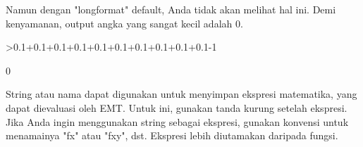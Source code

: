 \documentclass[a4paper,10pt]{article}
\begin{document}
\begin{eulernotebook}
\begin{eulercomment}
Namun dengan "longformat" default, Anda tidak akan melihat hal ini.
Demi kenyamanan, output angka yang sangat kecil adalah 0.
\end{eulercomment}
\begin{eulerprompt}
>0.1+0.1+0.1+0.1+0.1+0.1+0.1+0.1+0.1+0.1-1
\end{eulerprompt}
\begin{euleroutput}
  0
\end{euleroutput}
\begin{eulercomment}
String atau nama dapat digunakan untuk menyimpan ekspresi matematika,
yang dapat dievaluasi oleh EMT. Untuk ini, gunakan tanda kurung
setelah ekspresi. Jika Anda ingin menggunakan string sebagai ekspresi,
gunakan konvensi untuk menamainya "fx" atau "fxy", dst. Ekspresi lebih
diutamakan daripada fungsi.


\end{eulercomment}
\end{eulernotebook}
\end{document}
